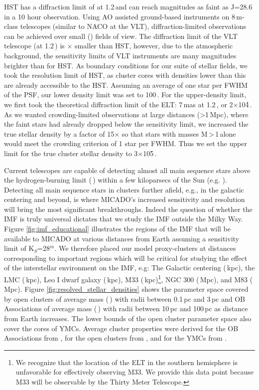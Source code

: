 HST has a diffraction limit of \arcsec at 1.2\,\um and can reach magnitudes as faint as J=28.6\m \citep{hst_wfc3} in a 10 hour observation. Using AO assisted ground-based instruments on 8\,m-class telescopes (similar to NACO at the VLT), diffraction-limited observations can be achieved over small (\arcmin) fields of view. 
The diffraction limit of the VLT telescope (\arcsec at 1.2\,\um) is $\times$ smaller than HST, however, due to the atmospheric background, the sensitivity limits of VLT instruments are many magnitudes brighter than for HST. 
As boundary conditions for our suite of stellar fields, we took the resolution limit of HST, as cluster cores with densities lower than this are already accessible to the HST. 
Assuming an average of one star per FWHM of the PSF, our lower density limit was set to 100\,\spae. 
For the upper-density limit, we first took the theoretical diffraction limit of the ELT: 7\,mas at 1.2\,\ume, or 2$\times$10\h4\,\spae. 
As we wanted crowding-limited observations at large distances (\textgreater1\,Mpc), where the faint stars had already dropped below the sensitivity limit, we increased the true stellar density by a factor of 15$\times$ so that stars with masses M\,\textgreater\,1\,\msun alone would meet the crowding criterion of 1 star per FWHM. 
Thus we set the upper limit for the true cluster stellar density to 3$\times$10\h5\,\spae. 

Current telescopes are capable of detecting almost all main sequence stars above the hydrogen-burning limit (\,\msune) within a few kiloparsecs of the Sun (e.g. \citealt{muzic17}). 
Detecting all main sequence stars in clusters further afield, e.g., in the galactic centering and beyond, is where MICADO's increased sensitivity and resolution will bring the most significant breakthroughs. 
Indeed the question of whether the IMF is truly universal dictates that we study the IMF outside the Milky Way. 
Figure \ref{fig:imf_educational} illustrates the regions of the IMF that will be available to MICADO at various distances from Earth assuming a sensitivity limit of K$_S$=28$^m$. 
We therefore placed our model proxy-clusters at distances corresponding to important regions which will be critical for studying the effect of the interstellar environment on the IMF, e.g: The Galactic centering (\,kpc), the LMC (\,kpc), Leo I dwarf galaxy (\,kpc), M33 (\,kpc)\footnote{We recognize that the location of the ELT in the southern hemisphere is unfavorable for effectively observing M33. We provide this data point because M33 will be observable by the Thirty Meter Telescope.}, NGC 300 (\,Mpc), and M83 (\,Mpc). 
Figure \ref{fig:resolved_stellar_densities} shows the parameter space covered by open clusters of average mass (\,\msun) with radii between 0.1\,pc and 3\,pc and OB Associations of average mass (\,\msun) with radii between 10\,pc and 100\,pc as distance from Earth increases. 
The lower bounds of the open cluster parameter space also cover the cores of YMCs. Average cluster properties were derived for the OB Associations from \citet{melnik1995}, for the open clusters from \citet{piskunov2007}, and for the YMCs from \citet{portegies2010}.


